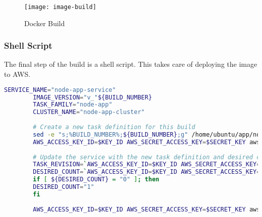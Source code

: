 		\begin{figure}[H]
			\caption{Docker Build}
			\centering
			\texttt{[image: image-build]}
			\label{fig:image-build}
		\end{figure}
	
		\subsubsection{Shell Script}
		The final step of the build is a shell script. This takes care of deploying the image to AWS.
		
		\begin{minipage}{\textwidth}
		\begin{lstlisting}[caption={Shell Script},label=shell-script,language=bash]
		SERVICE_NAME="node-app-service"
		IMAGE_VERSION="v_"${BUILD_NUMBER}
		TASK_FAMILY="node-app"
		CLUSTER_NAME="node-app-cluster"
		
		# Create a new task definition for this build
		sed -e "s;%BUILD_NUMBER%;${BUILD_NUMBER};g" /home/ubuntu/app/node-app.json > node-app-v_${BUILD_NUMBER}.json
		AWS_ACCESS_KEY_ID=$KEY_ID AWS_SECRET_ACCESS_KEY=$SECRET_KEY aws ecs --region eu-west-1 register-task-definition --family $TASK_FAMILY --cli-input-json file://node-app-v_${BUILD_NUMBER}.json
		
		# Update the service with the new task definition and desired count
		TASK_REVISION=`AWS_ACCESS_KEY_ID=$KEY_ID AWS_SECRET_ACCESS_KEY=$SECRET_KEY aws ecs --region eu-west-1 describe-task-definition --task-definition $TASK_FAMILY | egrep "revision" | tr "/" " " | awk '{print $2}' | sed 's/"$//'`
		DESIRED_COUNT=`AWS_ACCESS_KEY_ID=$KEY_ID AWS_SECRET_ACCESS_KEY=$SECRET_KEY aws ecs --region eu-west-1 describe-services --services ${SERVICE_NAME} --cluster $CLUSTER_NAME | egrep -m 1 "desiredCount" | tr "/" " " | awk '{print $2}' | sed 's/,$//'`
		if [ ${DESIRED_COUNT} = "0" ]; then
		DESIRED_COUNT="1"
		fi
		
		AWS_ACCESS_KEY_ID=$KEY_ID AWS_SECRET_ACCESS_KEY=$SECRET_KEY aws ecs --region eu-west-1 update-service --cluster $CLUSTER_NAME --service ${SERVICE_NAME} --task-definition ${TASK_FAMILY}:${TASK_REVISION} --desired-count ${DESIRED_COUNT}
		\end{lstlisting}
		\end{minipage}
		
